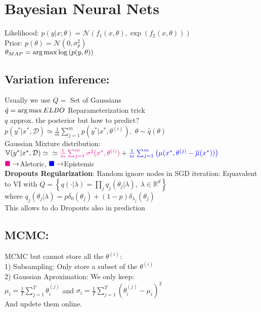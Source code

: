 \section{Bayesian Neural Nets}
Likelihood: $p(y\vert x;\theta) = \mathcal{N}(f_1(x,\theta), \exp{(f_2(x,\theta))})$\\
Prior: $p(\theta) = \mathcal{N}(0, \sigma_p^2)$\\
$\theta_{MAP} = \operatorname*{arg\,max} \log{(p(y, \theta))}$

\subsection{Variation inference:} Usually we use $Q =$ Set of Gaussians\\
 $\hat q =  \operatorname*{arg\,max} ELBO$ {\scriptsize Reparameterization trick}\\
$q$ approx. the posterior but how to predict?\\
$p(y^*\vert x^*, \mathcal{D})\simeq \frac{1}{m}\sum_{j=1}^m p(y^*\vert x^*, \theta^{(i)}),\;\theta \sim \hat q(\theta)$ \\
Gaussian Mixture distribution:
$\mathbb{V}(y^*\vert x^*,\mathcal{D}) \simeq \\
\simeq \begingroup\color{magenta}\frac{1}{m}\sum_{j=1}^m \sigma^2(x^*, \theta^{(i)})\endgroup + \begingroup\color{blue}\frac{1}{m}\sum_{j=1}^m\left(\mu(x^*,\theta^{(j)}-\bar\mu(x^*))\right)\endgroup$\\
$\begingroup\color{magenta}\blacksquare\endgroup \to $Aletoric,
$\begingroup\color{blue}\blacksquare\endgroup \to $Epistemic\\

\textbf{Dropouts Regularization}: Random ignore nodes in SGD iteration: 
Equavalent to VI with $Q = \left\{q(\cdot\vert \lambda) = \prod_j q_j(\theta_j\vert \lambda), \; \lambda \in \mathbb{R}^d \right\}$\\
where $q_j(\theta_j\vert \lambda) = p\delta_0(\theta_j) +  (1-p)\delta_{\lambda_j}(\theta_j)$\\
This allows to do Dropouts also in prediction

\subsection{MCMC:} MCMC but cannot store all the $\theta^{(i)}$:\\
1) Subsampling: Only store a subset of the  $\theta^{(i)}$\\
2) Gaussian Aproximation: We only keep:\\
$\mu_i=\frac{1}{T}\sum_{j=1}^T \theta_i^{(j)}$ and $\sigma_i=\frac{1}{T}\sum_{j=1}^T (\theta_i^{(j)}-\mu_i)^2$\\
And updete them online. 

